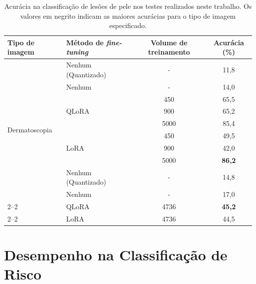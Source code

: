 \begin{table}[ht]
    \caption{\small Acurácia na classificação de lesões de pele nos testes realizados neste trabalho. Os valores em
    negrito indicam as maiores acurácias para o tipo de imagem especificado.}
    \centering
    \begin{tabular}{l|l|c|c}
        \hline
        Tipo de imagem                  & Método de \textit{fine-tuning} & Volume de treinamento & Acurácia (\%) \\ \hline
        \multirow{10}{*}{Dermatoscopia} & Nenhum (Quantizado)            & -                     & 11,8 \\
                                        & Nenhum                         & -                     & 14,0 \\ \cline{2--2}
                                        & \multirow{3}{*}{\ac{QLoRA}}    & 450                   & 65,5 \\
                                        &                                & 900                   & 65,2 \\
                                        &                                & 5000                  & 85,4 \\ \cline{2--2}
                                        & \multirow{3}{*}{\ac{LoRA}}     & 450                   & 49,5 \\
                                        &                                & 900                   & 42,0 \\
                                        &                                & 5000                  & \textbf{86,2} \\ \hline
        \multirow{4}{*}{Aproximação}    & Nenhum (Quantizado)            & -                     & 14,8 \\
                                        & Nenhum                         & -                     & 17,0 \\ \cline{2--2}
                                        & \ac{QLoRA}                     & 4736                  & \textbf{45,2} \\ \cline{2--2}
                                        & \ac{LoRA}                      & 4736                  & 44,5 \\ \hline
    \end{tabular}
    \label{tab:overall_comparison_skin_lesions}
\end{table}

\section{Desempenho na Classificação de Risco}

